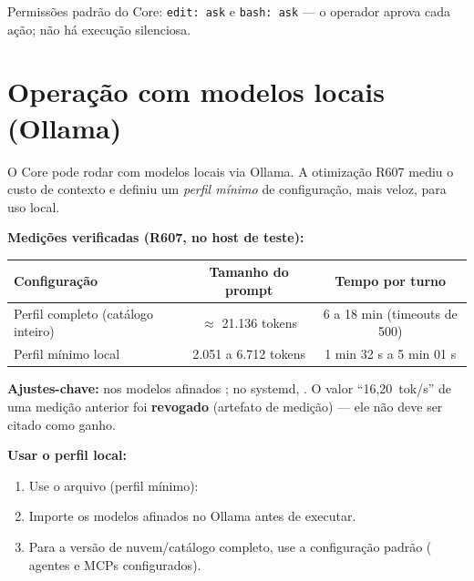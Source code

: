 \begin{limite}
Permissões padrão do Core: \texttt{edit: ask} e \texttt{bash: ask} — o operador
aprova cada ação; não há execução silenciosa.
\end{limite}

\section{Operação com modelos locais (Ollama)}


\begin{descricao}
O Core pode rodar com modelos locais via Ollama. A otimização R607 mediu o custo de
contexto e definiu um \emph{perfil mínimo} de configuração, mais veloz, para uso
local.
\end{descricao}

\begin{resultado}
\textbf{Medições verificadas (R607, no host de teste):}\par
\smallskip
{\footnotesize
\begin{tabularx}{\linewidth}{Xcc}
\toprule
Configuração & Tamanho do prompt & Tempo por turno \\
\midrule
Perfil completo (catálogo inteiro) & $\approx$ 21.136 tokens & 6 a 18 min (timeouts de 500) \\
Perfil mínimo local & 2.051 a 6.712 tokens & 1 min 32 s a 5 min 01 s \\
\bottomrule
\end{tabularx}\par}
\textbf{Ajustes-chave:}  nos modelos
afinados ; no systemd,
. O valor
``16,20~tok/s'' de uma medição anterior foi \textbf{revogado} (artefato de
medição) — ele não deve ser citado como ganho.
\end{resultado}

\begin{metodo}
\textbf{Usar o perfil local:}
\begin{enumerate}[leftmargin=1.4em,itemsep=1pt]
  \item Use o arquivo  (perfil mínimo):
  \item Importe os modelos afinados no Ollama antes de executar.
  \item Para a versão de nuvem/catálogo completo, use a configuração padrão
          (\CoreAgentCount{} agentes e \CoreMCPCount{} MCPs configurados).
\end{enumerate}
\end{metodo}


